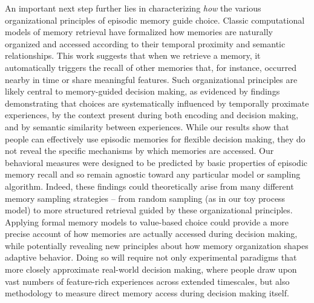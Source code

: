 \documentclass[10pt,letterpaper]{article}
\begin{document}
An important next step further lies in characterizing \textit{how} the various organizational principles of episodic memory guide choice. Classic computational models of memory retrieval have formalized how memories are naturally organized and accessed according to their temporal proximity and semantic relationships\cite{howardDistributedRepresentationTemporal2002, polynContextMaintenanceRetrieval2009, kahanaComputationalModelsMemory2020}. This work suggests that when we retrieve a memory, it automatically triggers the recall of other memories that, for instance, occurred nearby in time or share meaningful features. Such organizational principles are likely central to memory-guided decision making, as evidenced by findings demonstrating that choices are systematically influenced by temporally proximate experiences\cite{bornsteinRemindersChoicesBias2017}, by the context present during both encoding\cite{duncanModulatingUseMultiple2019} and decision making\cite{bornsteinReinstatedEpisodicContext2017,duncanModulatingUseMultiple2019}, and by semantic similarity between experiences\cite{plonskyRelianceSmallSamples2015, akaWhatWhatRemember2021}. While our results show that people can effectively use episodic memories for flexible decision making, they do not reveal the specific mechanisms by which memories are accessed. Our behavioral measures were designed to be predicted by basic properties of episodic memory recall and so remain agnostic toward any particular model or sampling algorithm. Indeed, these findings could theoretically arise from many different memory sampling strategies -- from random sampling (as in our toy process model) to more structured retrieval guided by these organizational principles. Applying formal memory models to value-based choice could provide a more precise account of how memories are actually accessed during decision making, while potentially revealing new principles about how memory organization shapes adaptive behavior. Doing so will require not only experimental paradigms that more closely approximate real-world decision making, where people draw upon vast numbers of feature-rich experiences across extended timescales, but also methodology to measure direct memory access during decision making itself.
\end{document}
